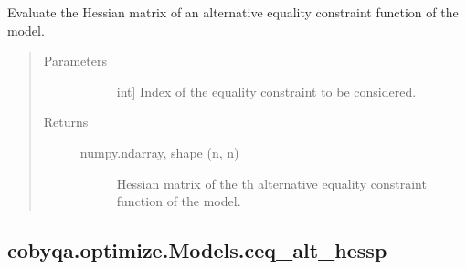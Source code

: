 \documentclass[letterpaper,10pt,english]{sphinxmanual}
\begin{document}
\begin{fulllineitems}
\begin{fulllineitems}
\label{\detokenize{refs/generated/cobyqa.optimize.Models.ceq_alt_hess:cobyqa.optimize.Models.ceq_alt_hess}}
\sphinxAtStartPar
Evaluate the Hessian matrix of an alternative equality constraint
function of the model.
\begin{quote}\begin{description}
\item[{Parameters}] \leavevmode\begin{description}
\item[{}] \leavevmode{[}int{]}
\sphinxAtStartPar
Index of the equality constraint to be considered.

\end{description}

\item[{Returns}] \leavevmode\begin{description}
\item[{numpy.ndarray, shape (n, n)}] \leavevmode
\sphinxAtStartPar
Hessian matrix of the \sphinxhyphen{}th alternative equality constraint
function of the model.

\end{description}

\end{description}\end{quote}

\end{fulllineitems}



\subsection{cobyqa.optimize.Models.ceq\_alt\_hessp}
\label{\detokenize{refs/generated/cobyqa.optimize.Models.ceq_alt_hessp:cobyqa-optimize-models-ceq-alt-hessp}}\label{\detokenize{refs/generated/cobyqa.optimize.Models.ceq_alt_hessp::doc}}


\end{fulllineitems}
\end{document}
